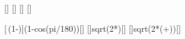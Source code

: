 [\meter]
[\degree]
[\meter]
[\mpss]

[\ell\,(1-\cos\alpha)]{\lSX*(1-cos(\waX*pi/180))}[\meter]
[]{sqrt(2*\gX*\hFX)}[\mps]
[]{sqrt(2*\gX*(\hFX+\dSX))}[\mps]
